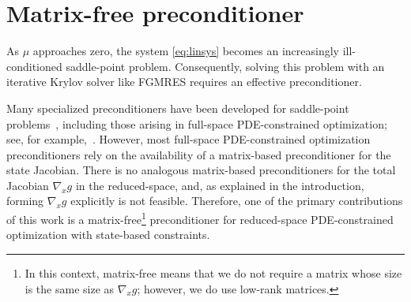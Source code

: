 \section{Matrix-free preconditioner}\label{sec:matfreepc}
As $\mu$ approaches zero, the system \eqref{eq:linsys} becomes an increasingly
ill-conditioned saddle-point problem.  Consequently, solving this problem with
an iterative Krylov solver like FGMRES requires an effective preconditioner.  

Many specialized preconditioners have been developed for saddle-point
problems~\cite{benzi2005numerical}, including those arising in full-space
PDE-constrained optimization; see, for example,~\cite{Rees2010optimal}.
However, most full-space PDE-constrained optimization preconditioners rely on
the availability of a matrix-based preconditioner for the state Jacobian. There
is no analogous matrix-based preconditioners for the total Jacobian $\nabla_x g$
in the reduced-space, and, as explained in the introduction, forming $\nabla_x
g$ explicitly is not feasible.  Therefore, one of the primary contributions of
this work is a matrix-free\footnote{In this context, matrix-free means that we
  do not require a matrix whose size is the same size as $\nabla_x g$; however,
  we do use low-rank matrices.} preconditioner for reduced-space PDE-constrained
optimization with state-based constraints.

